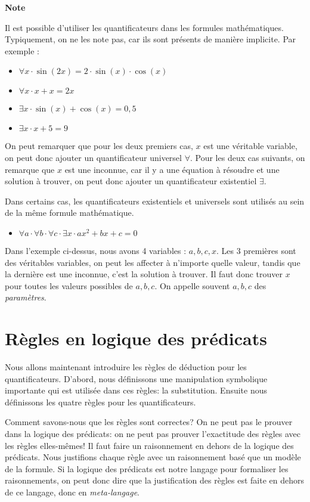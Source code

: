 \begin{framed}
\textbf{Note}

Il est possible d'utiliser les quantificateurs  dans les formules mathématiques. Typiquement, on ne les note pas, car ils sont présents de manière implicite. Par exemple :
\begin{itemize}
\item $\forall x \cdot \sin(2x) = 2 \cdot \sin(x) \cdot \cos(x)$ 
\item $\forall x \cdot x + x = 2x$
\item $\exists x \cdot \sin(x) + \cos(x) = 0,5$
\item $\exists x \cdot x + 5 = 9$
\end{itemize} 

On peut remarquer que pour les deux premiers cas, $x$ est une véritable variable, on peut donc ajouter un quantificateur universel $\forall$. 
Pour les deux cas suivants, on remarque que $x$ est une inconnue, car il y a une équation à résoudre et une solution à trouver, on peut donc ajouter un quantificateur existentiel $\exists$.

Dans certains cas, les quantificateurs existentiels et universels sont utilisés au sein de la même formule mathématique.
\begin{itemize}
\item[] $\forall a \cdot \forall b \cdot \forall c \cdot \exists x \cdot ax^{2}+bx+c = 0$
\end{itemize}
Dans l'exemple ci-dessus, nous avons 4 variables : $a,b,c,x$. Les 3 premières sont des véritables variables, on peut les affecter à n'importe quelle valeur, tandis que la dernière est une inconnue, c'est la solution à trouver. Il faut donc trouver $x$ pour toutes les valeurs possibles de $a,b,c$.
On appelle souvent $a,b,c$ des {\em paramètres}.
\end{framed}

\section{Règles en logique des prédicats}

Nous allons maintenant introduire les règles de déduction pour les quantificateurs.
D'abord, nous définissons une manipulation symbolique importante qui est utilisée
dans ces règles: la substitution.
Ensuite nous définissons les quatre règles pour les quantificateurs.

Comment savons-nous que les règles sont correctes?
On ne peut pas le prouver dans la logique des prédicats: on ne peut pas prouver l'exactitude
des règles avec les règles elles-mêmes!
Il faut faire un raisonnement en dehors de la logique des prédicats.
Nous justifions chaque règle avec un raisonnement basé que un modèle de la formule.
Si la logique des prédicats est notre langage pour formaliser les raisonnements,
on peut donc dire que la justification des règles est faite en dehors de ce langage, donc en {\em meta-langage}.

